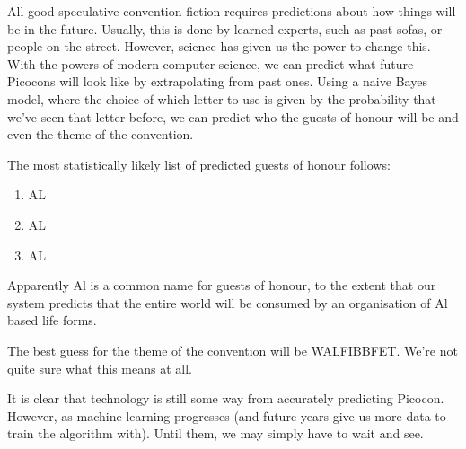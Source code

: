 All good speculative convention fiction requires predictions about how things will be in the future. Usually, this is done by learned experts,  such as past sofas, or people on the street. However, science has given us the power to change this. With the powers of modern computer science, we can predict what future Picocons will look like by extrapolating from past ones. Using a naive Bayes model, where the choice of which letter to use is given by the probability that we’ve seen that letter before, we can predict who the guests of honour will be and even the theme of the convention.

The most statistically likely list of predicted guests of honour follows:
\begin{enumerate}
\item	AL
\item	AL
\item	AL
\end{enumerate}

Apparently Al is a common name for guests of honour, to the extent that our system predicts that the entire world will be consumed by an organisation of Al based life forms.

The best guess for the theme of the convention will be WALFIBBFET.
We’re not quite sure what this means at all.

It is clear that technology is still some way from accurately predicting Picocon. However, as machine learning progresses (and future years give us more data to train the algorithm with). Until them, we may simply have to wait and see.
